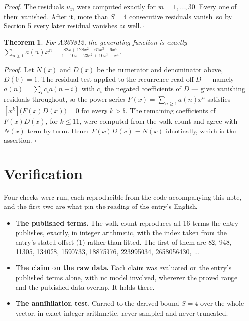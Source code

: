 \documentclass[11pt]{article}
\newtheorem{theorem}{Theorem}
\theoremstyle{definition}
\begin{document}
{\itshape Proof.} The residuals $u_m$ were computed exactly for $m = 1,\dots,30$. Every one of them vanished. After it, more than $S = 4$ consecutive residuals vanish, so by Section 5 every later residual vanishes as well. $\square$

\begin{theorem} For A263812, the generating function is exactly $\sum_{n\ge 1} a(n)x^n = \frac{82x + 128x^{2} - 61x^{3} - 6x^{4}}{1 - 10x - 23x^{2} + 10x^{3} + x^{4}}$.\end{theorem}

{\itshape Proof.} Let $N(x)$ and $D(x)$ be the numerator and denominator above, $D(0)=1$. The residual test applied to the recurrence read off $D$ --- namely $a(n) = \sum_i c_i a(n-i)$ with $c_i$ the negated coefficients of $D$ --- gives vanishing residuals throughout, so the power series $F(x)=\sum_{n\ge 1}a(n)x^n$ satisfies $[x^k]\bigl(F(x)D(x)\bigr) = 0$ for every $k > 5$. The remaining coefficients of $F(x)D(x)$, for $k \le 11$, were computed from the walk count and agree with $N(x)$ term by term. Hence $F(x)D(x) = N(x)$ identically, which is the assertion. $\square$

\section{Verification}

Four checks were run, each reproducible from the code accompanying this note, and the first two are what pin the reading of the entry's English.

\begin{itemize}

\item {\bfseries The published terms.} The walk count reproduces all 16 terms the entry publishes, exactly, in integer arithmetic, with the index taken from the entry's stated offset (1) rather than fitted. The first of them are 82, 948, 11305, 134028, 1590733, 18875976, 223995034, 2658056430,~\dots

\item {\bfseries The claim on the raw data.} Each claim was evaluated on the entry's published terms alone, with no model involved, wherever the proved range and the published data overlap. It holds there.

\item {\bfseries The annihilation test.} Carried to the derived bound $S = 4$ over the whole vector, in exact integer arithmetic, never sampled and never truncated.

\end{itemize}
\end{document}
